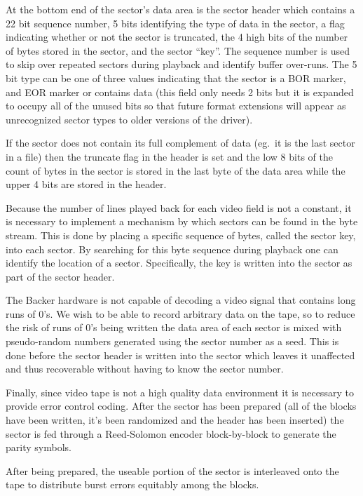 \documentclass{article}
\begin{document}
At the bottom end of the sector's data area is the sector header which
contains a 22 bit sequence number, 5 bits identifying the type of data in
the sector, a flag indicating whether or not the sector is truncated, the 4
high bits of the number of bytes stored in the sector, and the sector
``key''.  The sequence number is used to skip over repeated sectors during
playback and identify buffer over-runs.  The 5 bit type can be one of three
values indicating that the sector is a BOR marker, and EOR marker or
contains data (this field only needs 2 bits but it is expanded to occupy
all of the unused bits so that future format extensions will appear as
unrecognized sector types to older versions of the driver).

If the sector does not contain its full complement of data (eg.\ it is the
last sector in a file) then the truncate flag in the header is set and the
low 8 bits of the count of bytes in the sector is stored in the last byte
of the data area while the upper 4 bits are stored in the header.

Because the number of lines played back for each video field is not a
constant, it is necessary to implement a mechanism by which sectors can be
found in the byte stream.  This is done by placing a specific sequence of
bytes, called the sector key, into each sector.  By searching for this byte
sequence during playback one can identify the location of a sector.
Specifically, the key is written into the sector as part of the sector
header.

The Backer hardware is not capable of decoding a video signal that contains
long runs of 0's.  We wish to be able to record arbitrary data on the tape,
so to reduce the risk of runs of 0's being written the data area of each
sector is mixed with pseudo-random numbers generated using the sector
number as a seed.  This is done before the sector header is written into
the sector which leaves it unaffected and thus recoverable without having
to know the sector number.

Finally, since video tape is not a high quality data environment it is
necessary to provide error control coding.  After the sector has been
prepared (all of the blocks have been written, it's been randomized and the
header has been inserted) the sector is fed through a Reed-Solomon encoder
block-by-block to generate the parity symbols.

After being prepared, the useable portion of the sector is interleaved onto
the tape to distribute burst errors equitably among the blocks.
\end{document}
